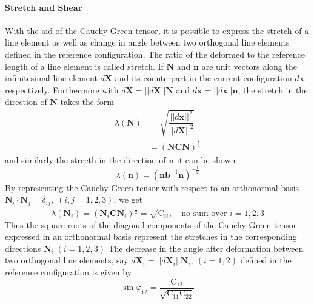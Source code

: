 \paragraph*{Stretch and Shear}
With the aid of the Cauchy-Green tensor, it is possible to express the stretch of a line element as well as change in angle between two orthogonal line elements defined in the reference configuration. The ratio of the deformed to the reference length of a line element is called stretch. If \(\bm{N}\) and \(\bm{n}\) are unit vectors along the infinitesimal line element \(d\bm{X}\) and its counterpart in the current configuration \(d\bm{x}\), respectively. Furthermore with \(d\bm{X}=||d\bm{X}||\bm{N}\) and \(d\bm{x}=||d\bm{x}||\bm{n}\), the stretch in the direction of \(\bm{N}\) takes the form
\begin{align}
    \nonumber\lambda(\bm{N}) &= \sqrt{\dfrac{||d\bm{x}||^{2}}{||d\bm{X}||^{2}}}\\
                    &= {(\bm{N}\bm{C}\bm{N})}^{\textstyle{\frac{1}{2}}}
\end{align}
and similarly the strecth in the direction of \(\bm{n}\) it can be shown
\begin{equation}
    \lambda(\bm{n}) = {(\bm{n}\bm{b}^{-1}\bm{n})}^{\textstyle-{\frac{1}{2}}}
\end{equation}
By representing the Cauchy-Green tensor with respect to an orthonormal basis \(\bm{N}_{i} \cdot \bm{N}_{j} = \delta_{ij},\;(i,j = 1,2,3)\), we get 
\begin{equation}
    \lambda(\bm{N}_i) 
    = {(\bm{N}_i\bm{C}\bm{N}_i)}^{\textstyle{\frac{1}{2}}}
    = \sqrt{\text{C}_{ii}}, \quad \text{no sum over } i = 1,2,3
\end{equation}
Thus the square roots of the diagonal components of the Cauchy-Green tensor expressed in an orthonormal basis represent the stretches in the corresponding directions \(\bm{N}_i\;(i=1,2,3)\)
The decrease in the angle after deformation between two orthogonal line elements, say \(d\bm{X}_{i}=||d\bm{X}_{i}||\bm{N}_{i},\: (i=1,2)\) defined in the reference configuration is given by
\begin{equation}
    \sin\varphi_{12} = \dfrac{\text{C}_{12}}{\sqrt{\text{C}_{11}\text{C}_{22}}}
\end{equation}

